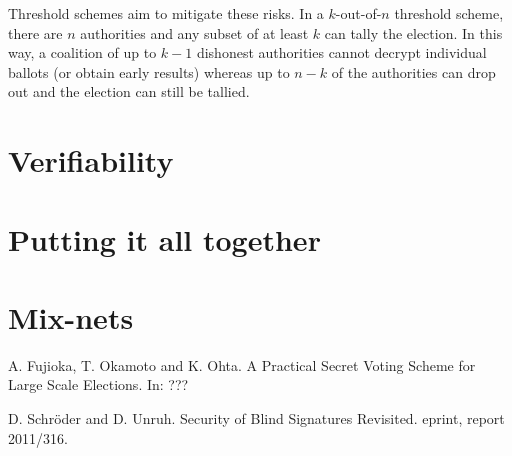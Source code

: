\documentclass{llncs}
\begin{document}
Threshold schemes aim to mitigate these risks. In a $k$-out-of-$n$ threshold
scheme, there are $n$ authorities and any subset of at least $k$ can tally the
election. In this way, a coalition of up to $k - 1$ dishonest authorities cannot
decrypt individual ballots (or obtain early results) whereas up to $n - k$ of
the authorities can drop out and the election can still be tallied.

\section{Verifiability}

\section{Putting it all together}

\section{Mix-nets}

\begin{thebibliography}{XXX11}
A. Fujioka, T. Okamoto and K. Ohta.
A Practical Secret Voting Scheme for Large Scale Elections.
In: ???

D. Schr\"oder and D. Unruh.
Security of Blind Signatures Revisited.
eprint, report 2011/316.

\end{thebibliography}
\end{document}
